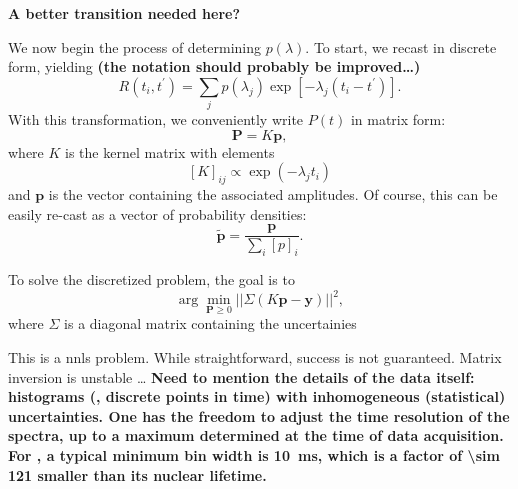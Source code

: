 \textbf{A better transition needed here?}


We now begin the process of determining $p ( \lambda )$.
To start, we recast  in discrete form, yielding
\textbf{(the notation should probably be improved\dots)}
%
\begin{equation} \label{eq:slr-sum}
   R \left (t_{i}, t^{\prime} \right ) = \sum_{j} p ( \lambda_{j} ) \exp \left [- \lambda_{j} \left ( t_{i} - t^{\prime} \right ) \right ] .
\end{equation}
%
With this transformation, we conveniently write $P(t)$ in matrix form:
%
\begin{equation} \label{eq:signal-matrix}
   \mathbf{P} = K \mathbf{p},
\end{equation}
%
where $K$ is the kernel matrix with elements
%
\begin{equation}
   \label{eq:kernel}
   [K]_{ij} \propto \exp \left ( - \lambda_{j} t_{i} \right )
\end{equation}
%
and $\mathbf{p}$ is the vector containing the associated amplitudes.
Of course, this can be easily re-cast as a vector of probability densities:
%
\begin{equation}
   \tilde{\mathbf{p}} = \frac{ \mathbf{p} }{ \sum_{i} [p]_{i} } .
\end{equation}
%


To solve the discretized problem, the goal is to
%
\begin{equation}
   \label{eq:onnls}
   \arg \min_{\mathbf{P} \geq 0} || \Sigma \left ( K \mathbf{p} - \mathbf{y} \right ) ||^{2} ,
\end{equation}
%
where $\Sigma$ is a diagonal matrix containing the uncertainies

This is a \gls{nnls} problem.
While straightforward, success is not guaranteed.
Matrix inversion is unstable \dots
\textbf{
Need to mention the details of the data itself:
histograms (, discrete points in time) with inhomogeneous (statistical) uncertainties.
One has the freedom to adjust the time resolution of the spectra, up to a maximum determined at the time of data acquisition.
For , a typical minimum bin width is \SI{10}{\milli\second}, which is a factor of \num{\sim 121} smaller than its nuclear lifetime.
}


